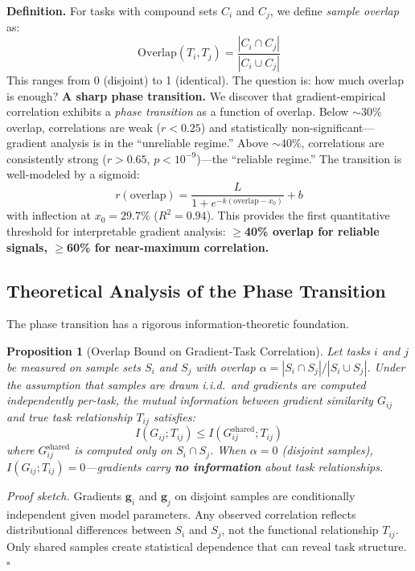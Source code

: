 \documentclass{article}
\newtheorem{proposition}{Proposition}
\begin{document}
\textbf{Definition.} For tasks with compound sets $C_i$ and $C_j$, we define \textit{sample overlap} as:
\begin{equation}
    \text{Overlap}(T_i, T_j) = \frac{|C_i \cap C_j|}{|C_i \cup C_j|}
\end{equation}%
This ranges from 0 (disjoint) to 1 (identical). The question is: how much overlap is enough?
\textbf{A sharp phase transition.} We discover that gradient-empirical correlation exhibits a \textit{phase transition} as a function of overlap. Below $\sim$30\% overlap, correlations are weak ($r < 0.25$) and statistically non-significant---gradient analysis is in the ``unreliable regime.'' Above $\sim$40\%, correlations are consistently strong ($r > 0.65$, $p < 10^{-9}$)---the ``reliable regime.'' The transition is well-modeled by a sigmoid:
\begin{equation}
    r(\text{overlap}) = \frac{L}{1 + e^{-k(\text{overlap} - x_0)}} + b
\end{equation}%
with inflection at $x_0 = 29.7\%$ ($R^2 = 0.94$). This provides the first quantitative threshold for interpretable gradient analysis: \textbf{$\geq$40\% overlap for reliable signals, $\geq$60\% for near-maximum correlation.}

\subsection{Theoretical Analysis of the Phase Transition}

The phase transition has a rigorous information-theoretic foundation.

\begin{proposition}[Overlap Bound on Gradient-Task Correlation]
Let tasks $i$ and $j$ be measured on sample sets $S_i$ and $S_j$ with overlap $\alpha = |S_i \cap S_j| / |S_i \cup S_j|$. Under the assumption that samples are drawn i.i.d.\ and gradients are computed independently per-task, the mutual information between gradient similarity $G_{ij}$ and true task relationship $T_{ij}$ satisfies:
\begin{equation}
    I(G_{ij}; T_{ij}) \leq I(G_{ij}^{\text{shared}}; T_{ij})
\end{equation}
where $G_{ij}^{\text{shared}}$ is computed only on $S_i \cap S_j$. When $\alpha = 0$ (disjoint samples), $I(G_{ij}; T_{ij}) = 0$---gradients carry \textbf{no information} about task relationships.
\end{proposition}

\textit{Proof sketch.} Gradients $\mathbf{g}_i$ and $\mathbf{g}_j$ on disjoint samples are conditionally independent given model parameters. Any observed correlation reflects distributional differences between $S_i$ and $S_j$, not the functional relationship $T_{ij}$. Only shared samples create statistical dependence that can reveal task structure. $\square$
\end{document}
